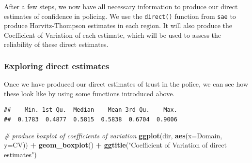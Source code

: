 \documentclass[
]{article}
\newenvironment{Shaded}{\begin{snugshade}}{\end{snugshade}}
\newcommand{\CommentTok}[1]{\textcolor[rgb]{0.56,0.35,0.01}{\textit{#1}}}
\newcommand{\DataTypeTok}[1]{\textcolor[rgb]{0.13,0.29,0.53}{#1}}
\newcommand{\DecValTok}[1]{\textcolor[rgb]{0.00,0.00,0.81}{#1}}
\newcommand{\KeywordTok}[1]{\textcolor[rgb]{0.13,0.29,0.53}{\textbf{#1}}}
\newcommand{\NormalTok}[1]{#1}
\newcommand{\OperatorTok}[1]{\textcolor[rgb]{0.81,0.36,0.00}{\textbf{#1}}}
\newcommand{\OtherTok}[1]{\textcolor[rgb]{0.56,0.35,0.01}{#1}}
\newcommand{\StringTok}[1]{\textcolor[rgb]{0.31,0.60,0.02}{#1}}
\begin{document}
After a few steps, we now have all necessary information to produce our
direct estimates of confidence in policing. We use the \texttt{direct()}
function from \texttt{sae} to produce Horvitz-Thompson estimates in each
region. It will also produce the Coefficient of Variation of each
estimate, which will be used to assess the reliability of these direct
estimates.

\begin{Shaded}
\end{Shaded}

\hypertarget{exploring-direct-estimates}{%
\subsubsection{Exploring direct
estimates}\label{exploring-direct-estimates}}

Once we have produced our direct estimates of trust in the police, we
can see how these look like by using some functions introduced above.

\begin{Shaded}
\end{Shaded}

\begin{verbatim}
##    Min. 1st Qu.  Median    Mean 3rd Qu.    Max. 
##  0.1783  0.4877  0.5815  0.5838  0.6704  0.9006
\end{verbatim}

\begin{Shaded}
\begin{Highlighting}[]
\CommentTok{# produce boxplot of coefficients of variation}
\KeywordTok{ggplot}\NormalTok{(dir, }\KeywordTok{aes}\NormalTok{(}\DataTypeTok{x=}\NormalTok{Domain, }\DataTypeTok{y=}\NormalTok{CV)) }\OperatorTok{+}\StringTok{ }
\StringTok{  }\KeywordTok{geom_boxplot}\NormalTok{() }\OperatorTok{+}
\StringTok{  }\KeywordTok{ggtitle}\NormalTok{(}\StringTok{"Coefficient of Variation of direct estimates"}\NormalTok{)}
\end{Highlighting}
\end{Shaded}
\end{document}
